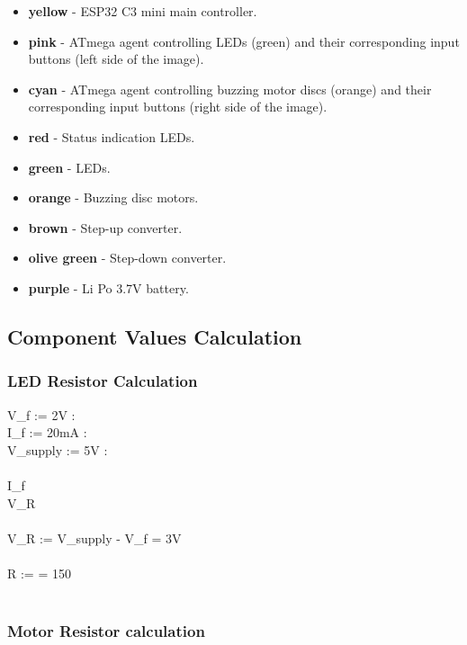 \documentclass[a4paper]{article}
\begin{document}
\begin{itemize}
\item \textbf{yellow} - ESP32 C3 mini main controller.
\item \textbf{pink} - ATmega agent controlling LEDs (green) and their corresponding input buttons (left side of the image).
\item \textbf{cyan} - ATmega agent controlling buzzing motor discs (orange) and their corresponding input buttons (right side of the image).
\item \textbf{red} - Status indication LEDs.
\item \textbf{green} - LEDs.
\item \textbf{orange} - Buzzing disc motors.
\item \textbf{brown} - Step-up converter.
\item \textbf{olive green} - Step-down converter.
\item \textbf{purple} - Li Po 3.7V battery.
\end{itemize}





\subsection{Component Values Calculation}

\subsubsection{LED Resistor Calculation}

V_f := 2V : \\
I_f := 20mA : \\
V_{supply} := 5V : \\
\\
I_f  \\
V_R  \\
\\
V_R := V_{supply} - V_f = 3V \\
\\
R :=  = 150 \Omega
\\
\\

\subsubsection{Motor Resistor calculation}
\end{document}

